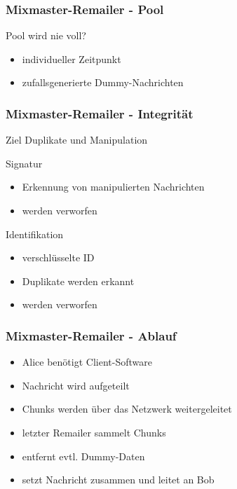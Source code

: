 \documentclass{beamer}
\begin{document}
\begin{frame}
	\frametitle{Mixmaster-Remailer - Pool}

	 {
	\begin{alertblock}{Pool wird nie voll?}
		\begin{itemize}
			\item individueller Zeitpunkt
			\item zufallsgenerierte Dummy-Nachrichten
		\end{itemize}
	\end{alertblock}
	}
\end{frame}

\begin{frame}
	\frametitle{Mixmaster-Remailer - Integrität}
	\begin{exampleblock}{Ziel}
		Duplikate und Manipulation
	\end{exampleblock}

	\begin{block}{Signatur}
		\begin{itemize}	
			\item Erkennung von manipulierten Nachrichten
			\item werden verworfen
		\end{itemize}
	\end{block}

	\begin{block}{Identifikation}
		\begin{itemize}
			\item verschlüsselte ID
			\item Duplikate werden erkannt
			\item werden verworfen
		\end{itemize}
	\end{block}
\end{frame}

\begin{frame}
	\frametitle{Mixmaster-Remailer - Ablauf}
	\begin{itemize}
		\item Alice benötigt Client-Software
		\item Nachricht wird aufgeteilt
		\item Chunks werden über das Netzwerk weitergeleitet
		\item letzter Remailer sammelt Chunks
		\item entfernt evtl. Dummy-Daten
		\item setzt Nachricht zusammen und leitet an Bob	
	\end{itemize}
\end{frame}
\end{document}
